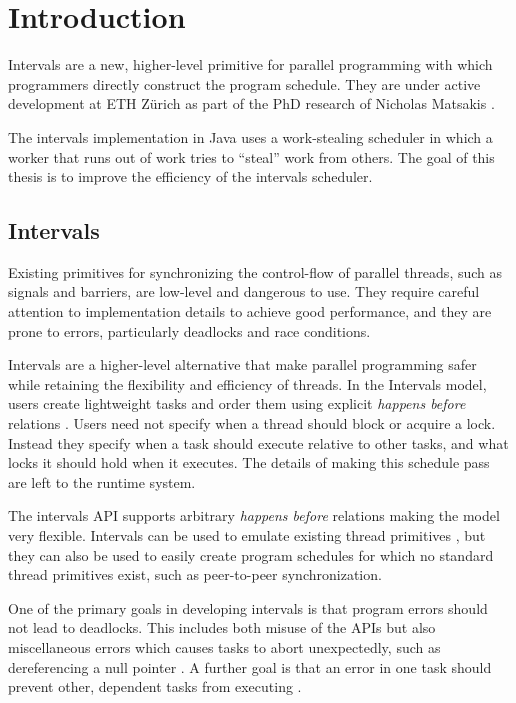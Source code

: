 
\chapter{Introduction}
\label{chap:introduction}

Intervals \cite{Matsakis2009b} are a new, higher-level primitive for
parallel programming with which programmers directly construct the
program schedule. They are under active development at ETH Zürich as
part of the PhD research of Nicholas Matsakis \cite{Matsakis2010}.

The intervals implementation in Java uses a work-stealing scheduler in
which a worker that runs out of work tries to ``steal'' work from
others. The goal of this thesis is to improve the efficiency of the
intervals scheduler.

\section{Intervals}
\label{sec:intro-intervals}

Existing primitives for synchronizing the control-flow of parallel
threads, such as signals and barriers, are low-level and dangerous to
use. They require careful attention to implementation details to
achieve good performance, and they are prone to errors, particularly
deadlocks and race conditions.

Intervals are a higher-level alternative that make parallel
programming safer while retaining the flexibility and efficiency of
threads. In the Intervals model, users create lightweight tasks and
order them using explicit \emph{happens before} relations
\cite{Lamport1978}. Users need not specify when a thread should block
or acquire a lock. Instead they specify when a task should execute
relative to other tasks, and what locks it should hold when it
executes. The details of making this schedule pass are left to the
runtime system.

The intervals API supports arbitrary \emph{happens before} relations
making the model very flexible. Intervals can be used to emulate
existing thread primitives \cite{Matsakis2009b}, but they can also be
used to easily create program schedules for which no standard thread
primitives exist, such as peer-to-peer synchronization.

One of the primary goals in developing intervals is that program
errors should not lead to deadlocks. This includes both misuse of the
APIs but also miscellaneous errors which causes tasks to abort
unexpectedly, such as dereferencing a null pointer
\cite{Matsakis2009}. A further goal is that an error in one task
should prevent other, dependent tasks from executing
\cite{Matsakis2010a}.


